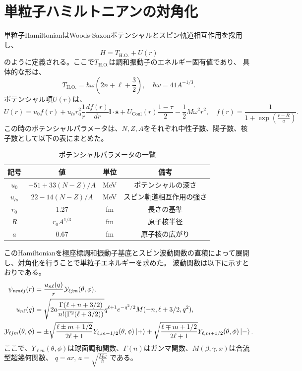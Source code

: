 \documentclass[a4paper,11pt]{jsreport}
\begin{document}
  \section{単粒子ハミルトニアンの対角化}
  単粒子HamiltonianはWoods-Saxonポテンシャルとスピン軌道相互作用を採用し、
  \begin{equation}
    H=T_{\text{H.O.}}+U(r)
  \end{equation}
  のように定義される。ここで\(T_{\text{H.O.}}\)は調和振動子のエネルギー固有値であり、
  具体的な形は、
  \begin{equation}
    T_{\text{H.O.}} = \hbar\omega\left(2n+\ell+\frac{3}{2}\right),\quad \hbar\omega=41A^{-1/3}.
  \end{equation}
  ポテンシャル項\(U(r)\)は、
  \begin{equation}
    U(r) = u_0 f(r) + u_{ls} r_0^2 \frac{1}{r} \frac{df(r)}{dr} \boldsymbol{l} \cdot \boldsymbol{s}
      + U_{\text{Coul}}(r) \frac{1 - \tau}{2}-\frac{1}{2}M\omega^2r^2, \quad f(r)=\frac{1}{1 + \exp \left( \frac{r - R}{a} \right)}.
  \end{equation}
  この時のポテンシャルパラメータは、\(N,Z,A\)をそれぞれ中性子数、陽子数、核子数として以下の表にまとめた。\par
  \begin{table}[htbp]
    \centering
    \caption{ポテンシャルパラメータの一覧}
    \begin{tabular}{c c c c}
        \hline
        記号 & 値 & 単位 & 備考 \\
        \hline
        \( u_0 \) & \(-51+33(N-Z)/A\) & MeV & ポテンシャルの深さ \\
        \( u_{ls} \) & \(22-14(N-Z)/A\) & MeV & スピン軌道相互作用の強さ \\
        \(r_0\)    & 1.27              &  fm & 長さの基準\\
        \( R \) & \(r_0 A^{1/3}\) & fm & 原子核半径 \\
        \( a \) & 0.67 & fm & 原子核の広がり \\
        \hline
    \end{tabular}
  \end{table}

  このHamiltonianを極座標調和振動子基底とスピン波動関数の直積によって展開し、対角化を行うことで単粒子エネルギーを求めた。
  波動関数は以下に示すとおりである。
  \begin{align}
    \psi_{nm\ell j}(r)  &=\frac{u_{n\ell}(q)}{r}\mathcal{Y}_{\ell j m}(\theta,\phi),\\
    u_{n\ell}(q)        &=\sqrt{2a\dfrac{\Gamma(\ell+n+3/2)}{n!(\Gamma^2(\ell+3/2))}}q^{\ell+1}e^{-q^2/2}M(-n,\ell+3/2,q^2),\\
    \mathcal{Y}_{\ell j m}(\theta,\phi)
    &=\pm\sqrt{\frac{\ell \pm m + 1/2}{2\ell+1}}Y_{\ell, m-1/2}(\theta,\phi)\ket{+}
    +\sqrt{\frac{\ell \mp m + 1/2}{2\ell+1}}Y_{\ell, m+1/2}(\theta,\phi)\ket{-}.
  \end{align}
  ここで、\(Y_{\ell m}(\theta,\phi)\)は球面調和関数、\(\Gamma(n)\)はガンマ関数、\(M(\beta,\gamma,x)\)は合流型超幾何関数、
  \(q=ar\), \(a=\sqrt{\frac{M\omega}{\hbar}}\) である。
\end{document}
